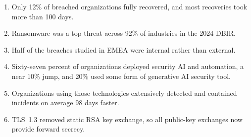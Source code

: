 \begin{tcolorbox}[
  colback=SoftYellow,
  colframe=IEEEblue!70!black,
  boxrule=0.5pt,
  arc=0mm,
  left=3mm,
  right=3mm,
  top=2mm,
  bottom=2mm
]
{\begin{enumerate}[leftmargin=1.6em,itemsep=1pt,topsep=1pt,parsep=0pt,partopsep=0pt]
\item Only 12\% of breached organizations fully recovered, and most recoveries took more than 100 days.
\item Ransomware was a top threat across 92\% of industries in the 2024 DBIR.
\item Half of the breaches studied in EMEA were internal rather than external.
\item Sixty-seven percent of organizations deployed security AI and automation, a near 10\% jump, and 20\% used some form of generative AI security tool.
\item Organizations using those technologies extensively detected and contained incidents on average 98 days faster.
\item TLS~1.3 removed static RSA key exchange, so all public-key exchanges now provide forward secrecy.
\end{enumerate}}
\end{tcolorbox}
